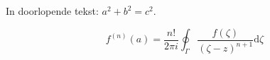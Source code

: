 In doorlopende tekst: $a^2+b^2=c^2$.

\begin{equation}
  f^{(n)}(a)=\frac{n!}{2\pi i}\oint_{\Gamma}
  \frac{f(\zeta)}{(\zeta-z)^{n+1}}\mathrm{d}\zeta
\end{equation}
